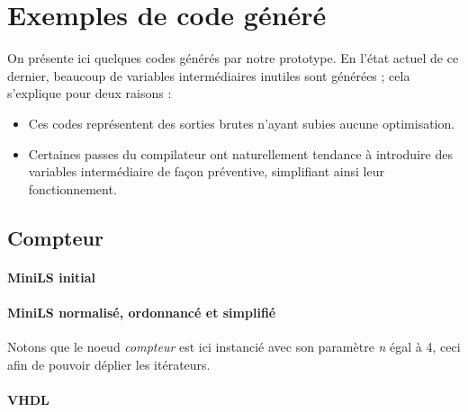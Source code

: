 \documentclass[a4paper]{article}
\begin{document}
\tableofcontents




\appendix

\newpage

\section{Exemples de code g\'en\'er\'e}

On pr\'esente ici quelques codes g\'en\'er\'es par notre prototype. En l'\'etat
actuel de ce dernier, beaucoup de variables interm\'ediaires inutiles sont
g\'en\'er\'ees ; cela s'explique pour deux raisons :

\begin{itemize}
\item Ces codes représentent des sorties brutes n'ayant subies aucune
  optimisation.
\item Certaines passes du compilateur ont naturellement tendance à introduire
  des variables intermédiaire de façon préventive, simplifiant ainsi leur
  fonctionnement.
\end{itemize}

\subsection{Compteur}

\paragraph{MiniLS initial}

\small

\normalsize

\paragraph{MiniLS normalis\'e, ordonnanc\'e et simplifi\'e}

Notons que le noeud \textit{compteur} est ici instanci\'e avec son param\`etre
\textit{n} \'egal \`a 4, ceci afin de pouvoir d\'eplier les it\'erateurs.

\small

\normalsize

\paragraph{VHDL}

\small

\normalsize
\end{document}
